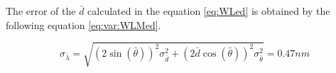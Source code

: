 \documentclass[twoside]{article}
\begin{document}
				The error of the $\bar{d}$ calculated in the equation \ref{eq:WLed} is obtained by the following equation \ref{eq:var:WLMed}.

					\begin{equation}
						\sigma_{\bar{\lambda}} = \sqrt{ (2\sin(\bar{\theta}))^2 \sigma_{\bar{d}}^2 + (2 \bar{d} \cos(\bar{\theta}))^2 \sigma^2_{\bar{\theta}}} = 0.47 nm
						\label{eq:var:WLMed}
					\end{equation}
\end{document}
